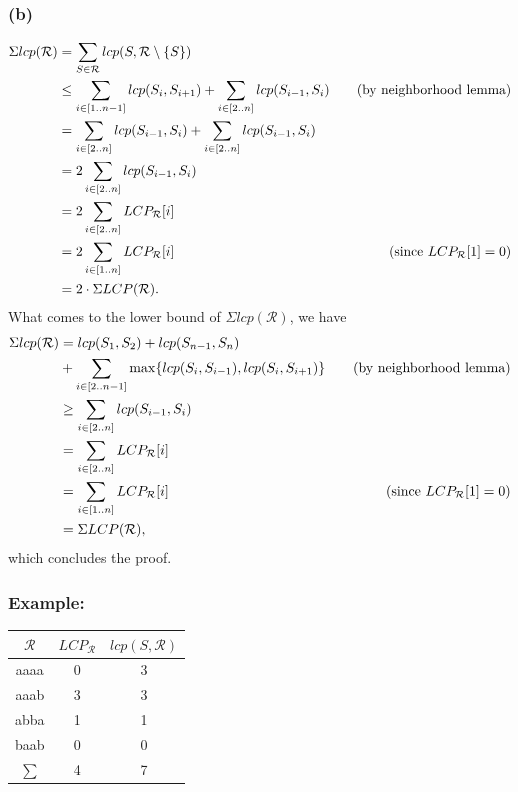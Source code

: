 \documentclass[10pt]{article}
\begin{document}
\subsubsection*{(b)}
\begin{align*}
\Sigma lcp(\mathcal{R}) &= \sum_{S \in \mathcal{R}} lcp(S, \mathcal{R} \setminus \{ S \}) \\
									  &\leq \sum_{i \in [1 .. n - 1]} lcp(S_i, S_{i + 1}) + \sum_{i \in [2 .. n]} lcp(S_{i - 1}, S_i) &\text{\quad (by neighborhood lemma)} \\
									  &= \sum_{i \in [2 .. n]} lcp(S_{i - 1}, S_i) + \sum_{i \in [2 .. n]} lcp(S_{i - 1}, S_i) \\
									  &= 2 \sum_{i \in [2 .. n]} lcp(S_{i - 1}, S_i) \\
									  &= 2 \sum_{i \in [2 .. n]} LCP_{\mathcal{R}}[i] \\
									  &= 2 \sum_{i \in [1 .. n]} LCP_{\mathcal{R}}[i] & \text{\quad (since } LCP_{\mathcal{R}}[1] = 0) \\
									  &= 2 \cdot \Sigma LCP(\mathcal{R}).
\end{align*}
What comes to the lower bound of $\Sigma lcp(\mathcal{R})$, we have
\begin{align*}
\Sigma lcp(\mathcal{R}) &= lcp(S_1, S_2) + lcp(S_{n - 1}, S_n) \\
 									  &+ \sum_{i \in [2 .. n - 1]} \max \{ lcp(S_i, S_{i - 1}), lcp(S_i, S_{i + 1}) \} &\text{\quad (by neighborhood lemma)} \\
    								  &\geq \sum_{i \in [2 .. n]} lcp(S_{i - 1}, S_i) \\
    								  &= \sum_{i \in [2 .. n]} LCP_{\mathcal{R}}[i] \\
    								  &= \sum_{i \in [1 .. n]} LCP_{\mathcal{R}}[i] & \text{\quad (since } LCP_{\mathcal{R}}[1] = 0) \\
    								  &= \Sigma LCP(\mathcal{R}),
\end{align*}
which concludes the proof.

\subsubsection*{Example:}
\begin{tabular}{|c|c|c|}
\hline
$\mathcal{R}$ & $LCP_{\mathcal{R}}$ & $lcp(S, \mathcal{R})$ \\
\hline
aaaa & 0 & 3 \\
aaab & 3 & 3 \\
abba & 1 & 1 \\
baab & 0 & 0 \\
\hline
$\sum$ & 4 & 7 \\
\hline
\end{tabular}
\end{document}
